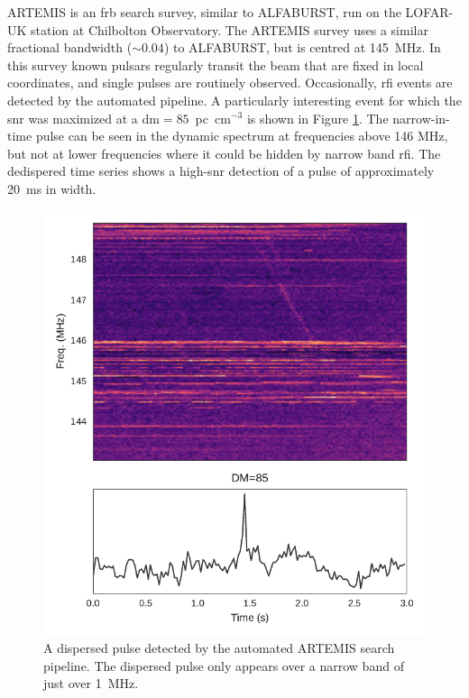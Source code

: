 \documentclass[a4paper,fleqn,usenatbib]{mnras}
\begin{document}
ARTEMIS \citep{2015MNRAS.452.1254K} is  an \gls{frb} search survey, similar to
ALFABURST, run on the LOFAR-UK station at Chilbolton Observatory. The ARTEMIS
survey uses a similar fractional bandwidth ($\sim 0.04$) to ALFABURST, but is
centred at 145~MHz. In this survey known pulsars regularly transit the beam that
are fixed in local coordinates, and single pulses are routinely observed.
Occasionally, \gls{rfi} events are detected by the automated pipeline.  A
particularly interesting event for which the \gls{snr} was maximized at a
\gls{dm}$= 85$~pc~cm$^{-3}$ is shown in Figure \ref{fig:lofar_dynamic}.  The
narrow-in-time pulse can be seen in the dynamic spectrum at frequencies above
146 MHz, but not at lower frequencies where it could be hidden by narrow band
\gls{rfi}.  The dedispered time series shows a high-\gls{snr} detection of a
pulse of approximately 20~ms in width.

\begin{figure}
    \includegraphics[width=1.0\linewidth]{figures/LOFAR_dynamic.pdf}
    \caption{A dispersed pulse detected by the automated ARTEMIS search
    pipeline. The dispersed pulse only appears over a narrow band of just over
    1~MHz.
    }
    \label{fig:lofar_dynamic}
\end{figure}
\end{document}

